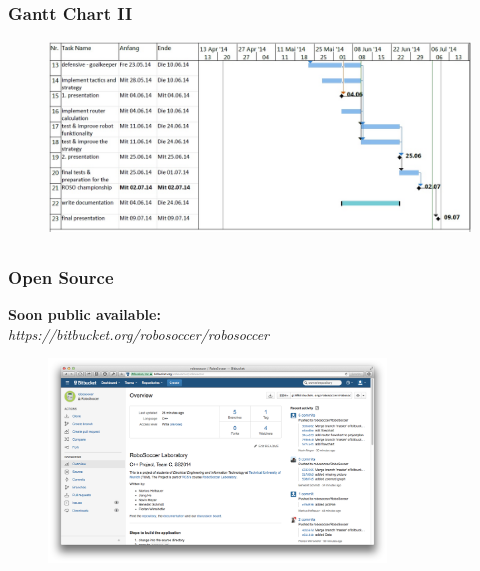 \documentclass[hyperref={pdfpagelabels=false},compress]{beamer}
\begin{document}
\begin{frame}
	\frametitle{Gantt Chart II}
	\begin{figure}
		\centering
		\includegraphics[width=\textwidth]{Pictures/ganttfinal2.jpg}
	\end{figure}
\end{frame}

\subsection{}
\begin{frame}
    \frametitle{Open Source}
    \textbf{Soon public available:}\\
    \textit{https://bitbucket.org/robosoccer/robosoccer}
    \begin{center}
        \begin{figure}
            \includegraphics[width=0.8\textwidth]{bucket.png}
        \end{figure}
    \end{center}
\end{frame}
\end{document}
